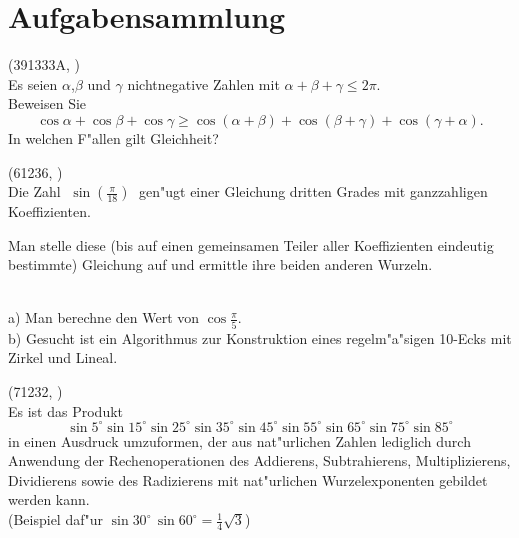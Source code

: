 \documentclass[11pt]{article}
\begin{document}
\section{Aufgabensammlung}
\begin{aufgabe}(391333A, \cite{MO})\\
  Es seien $\alpha$,$\beta$ und $\gamma$ nichtnegative Zahlen mit
  $\alpha+\beta+\gamma\leq2\pi$. \\
  Beweisen Sie
  \begin{equation*}
    \cos\alpha+\cos\beta+\cos\gamma
    \geq\cos(\alpha+\beta)+\cos(\beta+\gamma)+\cos(\gamma+\alpha) .
  \end{equation*}
  In welchen F"allen gilt Gleichheit?
\end{aufgabe}
\begin{aufgabe}(61236, \cite[A 24]{Lesebogen})\\
  Die Zahl 
  $\;\sin\left(\frac\pi{18}\right)\;$%
  gen"ugt einer Gleichung dritten Grades mit
  ganzzahligen Koeffizienten.
  
  Man stelle diese (bis auf einen gemeinsamen Teiler aller Koeffizienten
  eindeutig bestimmte) Gleichung auf und ermittle ihre beiden anderen Wurzeln.
\end{aufgabe}
\begin{aufgabe}\hspace*{1cm}\\
  a) Man berechne den Wert von $\cos\frac\pi5$.\\
  b) Gesucht ist ein Algorithmus zur Konstruktion eines regelm"a"sigen 10-Ecks
  mit Zirkel und Lineal.
\end{aufgabe}
\begin{aufgabe}(71232, \cite[A 25]{Lesebogen})\\
  Es ist das Produkt 
  \begin{equation*}
    \sin %
    5^\circ  
    \sin %
    15^\circ  
    \sin %
    25^\circ
    \sin %
    35^\circ
    \sin %
    45^\circ  
    \sin %
    55^\circ  
    \sin %
    65^\circ 
    \sin %
    75^\circ  
    \sin %
    85^\circ
  \end{equation*}
  in einen Ausdruck umzuformen, der aus nat"urlichen Zahlen lediglich durch
  Anwendung der Rechenoperationen des Addierens, Subtrahierens,
  Multiplizierens, Dividierens sowie des Radizierens mit nat"urlichen
  Wurzelexponenten gebildet werden kann.\\
  (Beispiel daf"ur $\sin30^\circ\,\sin60^\circ=\frac14\sqrt3$)
\end{aufgabe}
\end{document}
